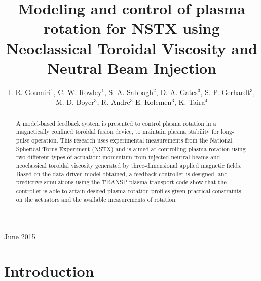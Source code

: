 \documentclass{iopart}
\begin{document}
\title[Modeling and control of plasma rotation using NTV and NBI]{Modeling and control of plasma rotation for NSTX using Neoclassical Toroidal Viscosity and Neutral Beam Injection}

\author{I. R. Goumiri$^1$, C. W. Rowley$^1$, S. A. Sabbagh$^2$, D. A. Gates$^3$, S. P. Gerhardt$^3$, M. D. Boyer$^3$, R. Andre$^3$  E. Kolemen$^3$, K. Taira$^4$ }

\address{$^1$ Department of Mechanical and Aerospace Engineering, Princeton University, Princeton, NJ 08544, USA}
\address{$^2$ Department of Applied Physics and Applied Mathematics, Columbia University, New York, NY 10027, USA}
\address{$^3$ Princeton Plasma Physics Laboratory, Princeton, NJ 08544, USA}
\address{$^4$ Florida Center for Advanced Aero-Propulsion, Florida State University, Tallahassee, Florida 32310, USA}

\vspace{10pt}
\begin{indented}
\item[]June 2015
\end{indented}

\begin{abstract}
A model-based feedback system is presented to control plasma rotation in a
magnetically confined toroidal fusion device, to maintain plasma stability for
long-pulse operation.
%
This research uses experimental measurements from the National Spherical Torus
Experiment (NSTX) and is aimed at controlling plasma rotation using two
different types of actuation: momentum
from injected neutral beams and neoclassical toroidal viscosity generated by
three-dimensional applied magnetic fields.
%
Based on the data-driven model obtained, a feedback controller is designed, and
predictive simulations using the TRANSP plasma transport code show that the
controller is able to attain desired plasma rotation profiles given practical
constraints on the actuators and the available measurements of rotation.
\end{abstract}

\ioptwocol


\section{Introduction}
\end{document}
